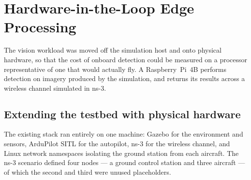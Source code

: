 %      
%
%
%

\section{Hardware-in-the-Loop Edge Processing}
\label{sec:hitl}

The vision workload was moved off the simulation host and onto physical
hardware, so that the cost of onboard detection could be measured on a processor
representative of one that would actually fly. A Raspberry~Pi~4B performs
detection on imagery produced by the simulation, and returns its results across a
wireless channel simulated in ns-3.

\subsection{Extending the testbed with physical hardware}
\label{sec:hitl-testbed}

The existing stack ran entirely on one machine: Gazebo for the environment and
sensors, ArduPilot SITL for the autopilot, ns-3 for the wireless channel, and
Linux network namespaces isolating the ground station from each aircraft. The
ns-3 scenario defined four nodes --- a ground control station and three aircraft
--- of which the second and third were unused placeholders.

